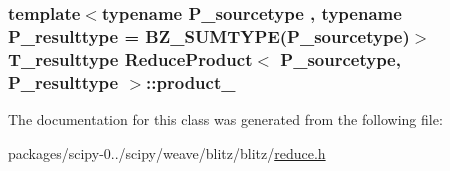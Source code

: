 \subsubsection[{product\+\_\+}]{\setlength{\rightskip}{0pt plus 5cm}template$<$typename P\+\_\+sourcetype , typename P\+\_\+resulttype  = B\+Z\+\_\+\+S\+U\+M\+T\+Y\+P\+E(\+P\+\_\+sourcetype)$>$ {\bf T\+\_\+resulttype} {\bf Reduce\+Product}$<$ P\+\_\+sourcetype, P\+\_\+resulttype $>$\+::product\+\_\+\hspace{0.3cm}{\ttfamily [protected]}}\label{classReduceProduct_a30301dc530285a65fb469edaa0d75864}


The documentation for this class was generated from the following file\+:\begin{DoxyCompactItemize}
\item 
packages/scipy-\/0../scipy/weave/blitz/blitz/\hyperlink{reduce_8h}{reduce.\+h}\end{DoxyCompactItemize}
